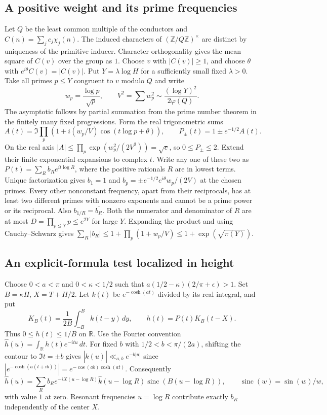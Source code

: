 \subsection{A positive weight and its prime frequencies}
Let $Q$ be the least common multiple of the conductors and
$C(n)=\sum_jc_j\chi_j(n)$. The induced characters of
$(\mathbb Z/Q\mathbb Z)^\times$ are distinct by uniqueness of the primitive
inducer. Character orthogonality gives the mean square of $C(v)$ over the
group as $1$. Choose $v$ with $|C(v)|\ge1$, and choose $\theta$ with
$e^{i\theta}C(v)=|C(v)|$. Put $Y=\lambda\log H$ for a sufficiently
small fixed $\lambda>0$. Take all primes $p\le Y$ congruent to $v$ modulo
$Q$ and write
\[
 w_p=\frac{\log p}{\sqrt p},\qquad V^2=\sum w_p^2
       \sim \frac{(\log Y)^2}{2\varphi(Q)}.
\]
The asymptotic follows by partial summation from the prime number theorem
in the finitely many fixed progressions. Form the real trigonometric sums
\[
 A(t)=\Im\prod_p(1+i(w_p/V)\cos(t\log p+\theta)),\qquad
 P_\pm(t)=1\pm e^{-1/2} A(t).
\]
On the real axis $|A|\le\prod_p\exp(w_p^2/(2V^2))=\sqrt e$, so
$0\le P_\pm\le2$. Extend their finite exponential expansions to complex
$t$. Write any one of these two as $P(t)=\sum_R b_R e^{it\log R}$,
where the positive rationals $R$ are in lowest terms.
Unique factorization gives $b_1=1$ and
$b_p=\pm e^{-1/2}e^{i\theta}w_p/(2V)$ at the chosen primes.
Every other nonconstant frequency, apart from their reciprocals, has at
least two different primes with nonzero exponents and cannot be a prime
power or its reciprocal. Also $b_{1/R}=\overline{b_R}$. Both the numerator
and denominator of $R$ are at most $D=\prod_{p\le Y}p\le e^{2Y}$ for
large $Y$. Expanding the product and using Cauchy--Schwarz gives
$\sum_R|b_R|\le 1+\prod_p(1+w_p/V)\le1+\exp(\sqrt{\pi(Y)})$.

\subsection{An explicit-formula test localized in height}
Choose $0<a<\pi$ and $0<\kappa<1/2$ such that
$a(1/2-\kappa)(2/\pi+\epsilon)>1$. Set $B=\kappa H$, $X=T+H/2$.
Let $k(t)$ be $e^{-\cosh(at)}$ divided by its real integral, and put
\[
 K_B(t)=\frac{1}{2B}\int_{-B}^{B}k(t-y)\,dy,\qquad
 h(t)=P(t)K_B(t-X).
\]
Thus $0\le h(t)\le1/B$ on $\mathbb R$. Use the Fourier convention
$\widehat h(u)=\int_{\mathbb R}h(t)e^{-itu}\,dt$.
For fixed $b$ with $1/2<b<\pi/(2a)$, shifting the contour to $\Im t=\pm b$
gives $|\widehat k(u)|\ll_{a,b}e^{-b|u|}$ since
$|e^{-\cosh(a(t+ib))}|=e^{-\cos(ab)\cosh(at)}$.
Consequently
\[
 \widehat h(u)=\sum_R b_R e^{-iX(u-\log R)}
       \widehat k(u-\log R)\operatorname{sinc}(B(u-\log R)),
 \qquad \operatorname{sinc}(w)=\sin(w)/w,
\]
with value $1$ at zero. Resonant frequencies $u=\log R$ contribute exactly
$b_R$ independently of the center $X$.

